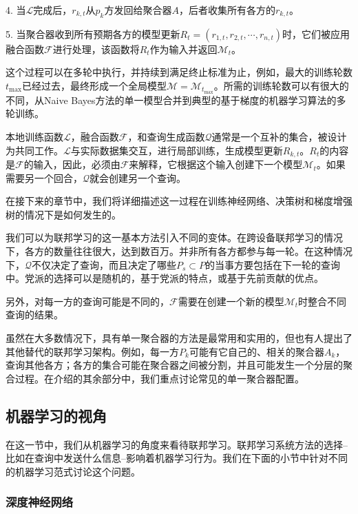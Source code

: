 4. 当$\mathcal{L}$完成后，$r_{k,t}$从$p_{k}$方发回给聚合器$A$，后者收集所有各方的$r_{k,t}$。

5. 当聚合器收到所有预期各方的模型更新$R_{t} = (r_{1,t}, r_{2,t}, \cdots , r_{n,t})$时，它们被应用融合函数$\mathcal{F}$进行处理，该函数将$R_{t}$作为输入并返回$\mathcal{M}_{t}$。

这个过程可以在多轮中执行，并持续到满足终止标准为止，例如，最大的训练轮数$t_{\max}$已经过去，最终形成一个全局模型$\mathcal{M} = \mathcal{M}_{t_{\max}}$。所需的训练轮数可以有很大的不同，从Naive Bayes方法的单一模型合并到典型的基于梯度的机器学习算法的多轮训练。

本地训练函数$\mathcal{L}$，融合函数$\mathcal{F}$，和查询生成函数$\mathcal{Q}$通常是一个互补的集合，被设计为共同工作。$\mathcal{L}$与实际数据集交互，进行局部训练，生成模型更新$R_{k,t}$。$R_{t}$的内容是$\mathcal{F}$的输入，因此，必须由$\mathcal{F}$来解释，它根据这个输入创建下一个模型$\mathcal{M}_{t}$。如果需要另一个回合，$\mathcal{Q}$就会创建另一个查询。

在接下来的章节中，我们将详细描述这一过程在训练神经网络、决策树和梯度增强树的情况下是如何发生的。

我们可以为联邦学习的这一基本方法引入不同的变体。在跨设备联邦学习的情况下，各方的数量往往很大，达到数百万。并非所有各方都参与每一轮。在这种情况下，$\mathcal{Q}$不仅决定了查询，而且决定了哪些$P_{s} \subset P$的当事方要包括在下一轮的查询中。党派的选择可以是随机的，基于党派的特点，或基于先前贡献的优点。

另外，对每一方的查询可能是不同的，$\mathcal{F}$需要在创建一个新的模型$\mathcal{M}_{t}$时整合不同查询的结果。

虽然在大多数情况下，具有单一聚合器的方法是最常用和实用的，但也有人提出了其他替代的联邦学习架构。例如，每一方$P_{k}$可能有它自己的、相关的聚合器$A_{k}$，查询其他各方；各方的集合可能在聚合器之间被分割，并且可能发生一个分层的聚合过程。在介绍的其余部分中，我们重点讨论常见的单一聚合器配置。

\subsection{机器学习的视角}

在这一节中，我们从机器学习的角度来看待联邦学习。联邦学习系统方法的选择--比如在查询中发送什么信息--影响着机器学习行为。我们在下面的小节中针对不同的机器学习范式讨论这个问题。

\subsubsection{深度神经网络}

